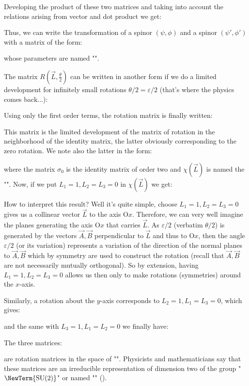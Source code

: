 	Developing the product of these two matrices and taking into account the relations arising from vector and dot product we get:
	
	Thus, we can write the transformation of a spinor $(\psi,\phi)$ and a spinor $(\psi',\phi')$ with a matrix of the form:
	
	whose parameters are named "".
	
	The matrix $R\left(\vec{L},\frac{\theta}{2}\right)$ can be written in another form if we do a limited development for infinitely small rotations $\theta/2=\varepsilon/2$ (that's where the physics comes back...):
	
	Using only the first order terms, the rotation matrix is finally written:
	
	This matrix is the limited development of the matrix of rotation in the neighborhood of the identity matrix, the latter obviously corresponding to the zero rotation. We note also the latter in the form:
	
	where the matrix $\sigma_0$ is the identity matrix of order two and $\chi(\vec{L})$ is named the "". Now, if we put $L_1=1,L_2=L_3=0$ in $\chi(\vec{L})$ we get:
	
	How to interpret this result? Well it's quite simple, choose $L_1=1,L_2=L_3=0$ gives us a collinear vector $\vec{L}$ to the axis $\text{O}x$. Therefore, we can very well imagine the planes generating the axis $\text{O}x$ that carries $\vec{L}$. As $\varepsilon/2$ (verbatim $\theta/2$) is generated by the vectors $\vec{A},\vec{B}$ perpendicular to $\vec{L}$ and thus to $\text{O}x$, then the angle $\varepsilon/2$ (or its variation) represents a variation of the direction of the normal planes to $\vec{A},\vec{B}$ which by symmetry are used to construct the rotation (recall that $\vec{A},\vec{B}$are not necessarily mutually orthogonal). So by extension, having  $L_1=1,L_2=L_3=0$ allows us then only to make rotations (symmetries) around the $x$-axis.
	
	Similarly, a rotation about the $y$-axis corresponds to $L_2=1,L_1=L_3=0$, which gives:
	
	and the same with $L_3=1,L_1=L_2=0$ we finally have:
	
	The three matrices:
	
	are rotation matrices in the space of "". Physicists and mathematicians say that these matrices are an irreducible representation of dimension two of the group "$\NewTerm{\text{SU} (2)}$" or named  "" ().
	
